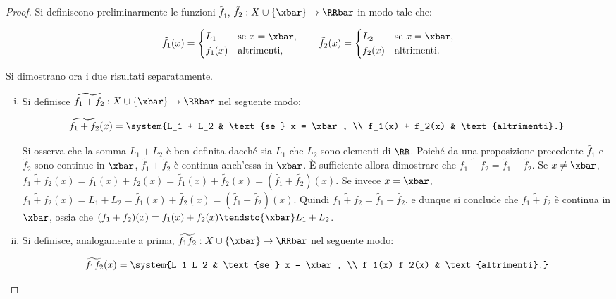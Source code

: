 \documentclass[11pt]{article}
\begin{document}
	\begin{proof}
		Si definiscono preliminarmente le funzioni $\tilde{f_1}$, $\tilde{f_2} : X \cup \{\xbar\} \to \RRbar$ in modo tale che:
		
		\[ \tilde{f_1}(x) = \begin{cases}
			L_1 & \text{se } x = \xbar, \\
			f_1(x) & \text{altrimenti},
		\end{cases} \qquad
		\tilde{f_2}(x) = \begin{cases}
			L_2 & \text{se } x = \xbar, \\
			f_2(x) & \text{altrimenti}.
		\end{cases} \]
		
		\vskip 0.1in
	
		Si dimostrano ora i due risultati separatamente. \\
		
		\begin{enumerate}[(i)]
			\item Si definisce $\widetilde{f_1 + f_2} : X \cup \{\xbar\} \to \RRbar$ nel seguente modo:
			
			\[ \widetilde{f_1 + f_2}(x) = \system{L_1 + L_2 & \text{se } x = \xbar, \\ f_1(x) + f_2(x) & \text{altrimenti}.} \]
			
			Si osserva che la somma $L_1 + L_2$ è ben definita dacché sia $L_1$ che $L_2$ sono elementi di $\RR$.
			Poiché da una proposizione precedente $\tilde{f_1}$ e $\tilde{f_2}$ sono continue in $\xbar$, $\tilde{f_1} + \tilde{f_2}$ è continua anch'essa in $\xbar$. È sufficiente allora dimostrare che $\widetilde{f_1 + f_2} =
			\tilde{f_1} + \tilde{f_2}$. Se $x \neq \xbar$, $\widetilde{f_1 + f_2}(x) = f_1(x) + f_2(x) = \tilde{f_1}(x) + \tilde{f_2}(x) = (\tilde{f_1} + \tilde{f_2})(x)$. Se invece $x = \xbar$, $\widetilde{f_1 + f_2}(x) = L_1 + L_2 =
			\tilde{f_1}(x) + \tilde{f_2}(x) = (\tilde{f_1} + \tilde{f_2})(x)$. Quindi $\widetilde{f_1 + f_2} =
			\tilde{f_1} + \tilde{f_2}$, e dunque si conclude che $\widetilde{f_1 + f_2}$ è continua in $\xbar$, ossia
			che $(f_1 + f_2)(x) = f_1(x) + f_2(x) \tendsto{\xbar} L_1 + L_2$.
			
			\item Si definisce, analogamente a prima, $\widetilde{f_1 f_2} : X \cup \{\xbar\} \to \RRbar$ nel seguente modo:
			
			\[ \widetilde{f_1 f_2}(x) = \system{L_1 L_2 & \text{se } x = \xbar, \\ f_1(x) f_2(x) & \text{altrimenti}.} \]
			

\end{enumerate}
\end{proof}
\end{document}
